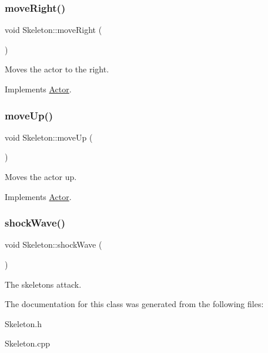 \subsubsection{\texorpdfstring{moveRight()}{moveRight()}}
{\footnotesize\ttfamily void Skeleton\+::move\+Right (\begin{DoxyParamCaption}{ }\end{DoxyParamCaption})\hspace{0.3cm}{\ttfamily [virtual]}}



Moves the actor to the right. 



Implements \mbox{\hyperlink{classActor_a9176d8f8ec68fcbd91c48223e7c65775}{Actor}}.

\mbox{\label{classSkeleton_a0ddbea7574ada0b5cef0cadbd4a0dd9f}} 
\subsubsection{\texorpdfstring{moveUp()}{moveUp()}}
{\footnotesize\ttfamily void Skeleton\+::move\+Up (\begin{DoxyParamCaption}{ }\end{DoxyParamCaption})\hspace{0.3cm}{\ttfamily [virtual]}}



Moves the actor up. 



Implements \mbox{\hyperlink{classActor_afaa299f90233461ee4df96dcfda3008a}{Actor}}.

\mbox{\label{classSkeleton_a6113054cad95c0eefbe3c64c58027f86}} 
\subsubsection{\texorpdfstring{shockWave()}{shockWave()}}
{\footnotesize\ttfamily void Skeleton\+::shock\+Wave (\begin{DoxyParamCaption}{ }\end{DoxyParamCaption})}



The skeletons attack. 



The documentation for this class was generated from the following files\+:\begin{DoxyCompactItemize}
\item 
Skeleton.\+h\item 
Skeleton.\+cpp\end{DoxyCompactItemize}
